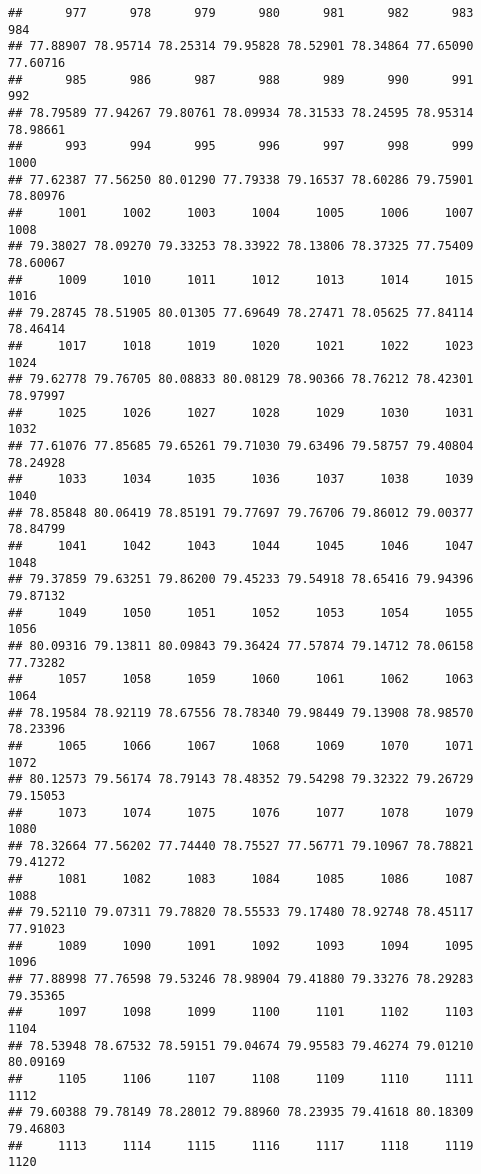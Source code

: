 \documentclass[
]{article}
\begin{document}
\begin{verbatim}
##      977      978      979      980      981      982      983      984 
## 77.88907 78.95714 78.25314 79.95828 78.52901 78.34864 77.65090 77.60716 
##      985      986      987      988      989      990      991      992 
## 78.79589 77.94267 79.80761 78.09934 78.31533 78.24595 78.95314 78.98661 
##      993      994      995      996      997      998      999     1000 
## 77.62387 77.56250 80.01290 77.79338 79.16537 78.60286 79.75901 78.80976 
##     1001     1002     1003     1004     1005     1006     1007     1008 
## 79.38027 78.09270 79.33253 78.33922 78.13806 78.37325 77.75409 78.60067 
##     1009     1010     1011     1012     1013     1014     1015     1016 
## 79.28745 78.51905 80.01305 77.69649 78.27471 78.05625 77.84114 78.46414 
##     1017     1018     1019     1020     1021     1022     1023     1024 
## 79.62778 79.76705 80.08833 80.08129 78.90366 78.76212 78.42301 78.97997 
##     1025     1026     1027     1028     1029     1030     1031     1032 
## 77.61076 77.85685 79.65261 79.71030 79.63496 79.58757 79.40804 78.24928 
##     1033     1034     1035     1036     1037     1038     1039     1040 
## 78.85848 80.06419 78.85191 79.77697 79.76706 79.86012 79.00377 78.84799 
##     1041     1042     1043     1044     1045     1046     1047     1048 
## 79.37859 79.63251 79.86200 79.45233 79.54918 78.65416 79.94396 79.87132 
##     1049     1050     1051     1052     1053     1054     1055     1056 
## 80.09316 79.13811 80.09843 79.36424 77.57874 79.14712 78.06158 77.73282 
##     1057     1058     1059     1060     1061     1062     1063     1064 
## 78.19584 78.92119 78.67556 78.78340 79.98449 79.13908 78.98570 78.23396 
##     1065     1066     1067     1068     1069     1070     1071     1072 
## 80.12573 79.56174 78.79143 78.48352 79.54298 79.32322 79.26729 79.15053 
##     1073     1074     1075     1076     1077     1078     1079     1080 
## 78.32664 77.56202 77.74440 78.75527 77.56771 79.10967 78.78821 79.41272 
##     1081     1082     1083     1084     1085     1086     1087     1088 
## 79.52110 79.07311 79.78820 78.55533 79.17480 78.92748 78.45117 77.91023 
##     1089     1090     1091     1092     1093     1094     1095     1096 
## 77.88998 77.76598 79.53246 78.98904 79.41880 79.33276 78.29283 79.35365 
##     1097     1098     1099     1100     1101     1102     1103     1104 
## 78.53948 78.67532 78.59151 79.04674 79.95583 79.46274 79.01210 80.09169 
##     1105     1106     1107     1108     1109     1110     1111     1112 
## 79.60388 79.78149 78.28012 79.88960 78.23935 79.41618 80.18309 79.46803 
##     1113     1114     1115     1116     1117     1118     1119     1120 

\end{verbatim}
\end{document}
